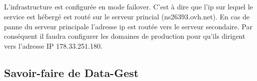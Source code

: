 \subparagraph{}
L'infrastructure est configurée en mode failover. C'est à dire que l'ip sur lequel le service est hébergé est routé sur le
serveur princial (ns26393.ovh.net). En cas de panne du serveur principale l'adresse ip est routée vers le serveur
secondaire. Par conséquent il faudra configurer les domaines de production pour qu'ils dirigent vers l'adresse IP
178.33.251.180.




%
%
%
%
%

\subsection{Savoir-faire de Data-Gest}

